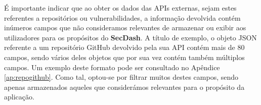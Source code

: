 É importante indicar que ao obter os dados das APIs externas, sejam estes referentes a repositórios ou vulnerabilidades, a informação devolvida contém inúmeros campos que não consideramos relevantes de armazenar ou exibir aos utilizadores para os propósitos do \textbf{SecDash}. A título de exemplo, o objeto JSON referente a um repositório GitHub devolvido pela sua API contém mais de 80 campos, sendo vários deles objetos que por sua vez contém também múltiplos campos. Um exemplo deste formato pode ser consultado no Apêndice \ref{ap:repogithub}. Como tal, optou-se por filtrar muitos destes campos, sendo apenas armazenados aqueles que considerámos relevantes para o propósito da aplicação. \\